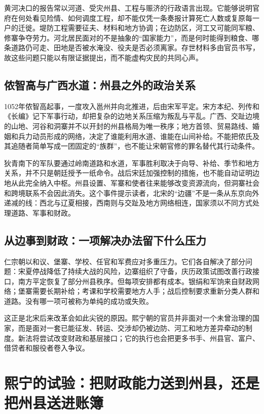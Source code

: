 黄河决口的报告常以河道、受灾州县、工程与赈济的行政语言出现。它能够说明官府在何处看见险情、如何调度工程，却不能仅凭一条奏报计算死亡人数或复原每一户的迁徙。堤防工程需要征夫、材料和地方协调；在边防区，河工又可能同军粮、修寨争夺劳力。河北居民面对的不是抽象的“国家能力”，而是何时能得到粮食、哪条道路仍可走、田地是否被水淹没、役夫是否必须离家。存世材料多由官员书写，故这些问题只能以有限证据提出，而不能虚构灾民的共同心声。

\subsection{侬智高与广西水道：州县之外的政治关系}

1052年侬智高起事，一度攻入邕州并向北推进，后由宋军平定。宋方本纪、列传和《长编》记下军事行动，却把复杂的边地关系压缩为叛乱与平乱。广西、交趾边境的山地、河谷和洞寨并不以开封的州县格局为唯一秩序；地方首领、贸易路线、婚姻和兵力动员形成的网络，决定了谁能利用水道、谁能在山间补给。不能把侬氏及其追随者简单写成一团固定的“族群”，也不能让宋朝官修的罪名替代其行动条件。

狄青南下的军队要通过岭南道路和水道，军事胜利取决于向导、补给、季节和地方关系，并不只是朝廷授予一纸命令。战后宋廷加强控制的措施，也不能自动证明边地从此完全纳入中枢。州县设置、军寨和使者往来能够改变资源流向，但洞寨社会和跨境联系不会因此消失。这个事件提示读者，北宋的“边疆”不是一条从东京向外递减的线：西北与辽夏相接，西南则与交趾及地方网络相连，国家须以不同方式处理道路、军事和财政。

\subsection{从边事到财政：一项解决办法留下什么压力}

仁宗朝以和议、堡寨、学校、任官和军费应对多重压力。它们各自解决了部分问题：宋夏停战降低了持续大战的风险，边寨组织了守备，庆历政策试图改善行政接口，南方平定恢复了部分州县秩序。但每项安排都有成本。银绢和军饷来自财政网络；堡寨需要长期补给；考课和学校需要地方人手；战后控制要求重新分类人群和道路。没有哪一项可被称为单纯的成功或失败。

这正是北宋后来改革会如此尖锐的原因。熙宁朝的官员并非面对一个未曾治理的国家，而是面对一套已能征发、转运、交涉却仍被边防、河工和地方差异牵动的制度。新法将尝试改变财政和基层接口；它的执行也会把更多书手、州县官、富户、借贷者和服役者卷入争议。

\section{熙宁的试验：把财政能力送到州县，还是把州县送进账簿}

